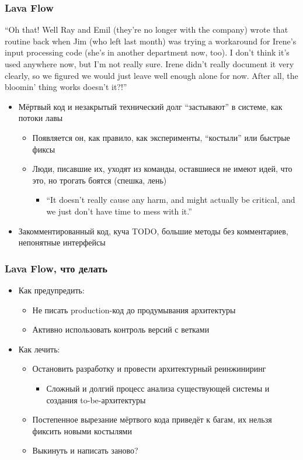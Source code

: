 \documentclass[xetex,mathserif,serif]{beamer}
\begin{document}
	\begin{frame}
		\frametitle{Lava Flow}
		\begin{footnotesize}
			``Oh that! Well Ray and Emil (they’re no longer with the company) wrote that routine back when Jim (who left last month) was trying a workaround for Irene’s input processing code (she’s in another department now, too). I don’t think it’s used anywhere now, but I’m not really sure. Irene didn’t really document it very clearly, so we figured we would just leave well enough alone for now. After all, the bloomin’ thing works doesn’t it?!''
		\end{footnotesize}
		\vspace{0.3cm}
		\begin{itemize}
			\item Мёртвый код и незакрытый технический долг ``застывают'' в системе, как потоки лавы
			\begin{itemize}
				\item Появляется он, как правило, как эксперименты, ``костыли'' или быстрые фиксы
				\item Люди, писавшие их, уходят из команды, оставшиеся не имеют идей, что это, но трогать боятся (спешка, лень)
				\begin{itemize}
					\item ``It doesn’t really cause any harm, and might actually be critical, and we just don’t have time to mess with it.''
				\end{itemize}
			\end{itemize}
			\item Закомментированный код, куча TODO, большие методы без комментариев, непонятные интерфейсы
		\end{itemize}
	\end{frame}

	\begin{frame}
		\frametitle{Lava Flow, что делать}
		\begin{itemize}
			\item Как предупредить:
			\begin{itemize}
				\item Не писать production-код до продумывания архитектуры
				\item Активно использовать контроль версий с ветками
			\end{itemize}
			\item Как лечить:
			\begin{itemize}
				\item Остановить разработку и провести архитектурный реинжиниринг
				\begin{itemize}
					\item Сложный и долгий процесс анализа существующей системы и создания to-be-архитектуры
				\end{itemize}
				\item Постепенное вырезание мёртвого кода приведёт к багам, их нельзя фиксить новыми костылями
				\item Выкинуть и написать заново?
			\end{itemize}
		\end{itemize}
	\end{frame}
\end{document}
